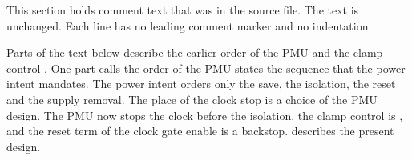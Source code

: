 This section holds comment text that was in the source file. The text is unchanged. Each line has no leading comment marker and no indentation.

\begin{information}
Parts of the text below describe the earlier order of the PMU and the clamp control . One part calls the order of the PMU states the sequence that the power intent mandates. The power intent orders only the save, the isolation, the reset and the supply removal. The place of the clock stop is a choice of the PMU design. The PMU now stops the clock before the isolation, the clamp control is , and the reset term of the clock gate enable is a backstop.  describes the present design.
\end{information}

